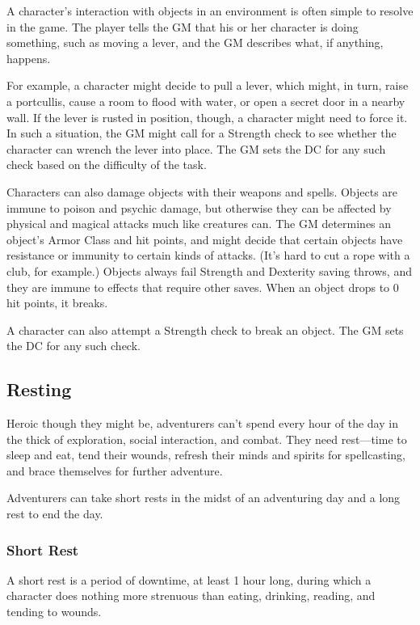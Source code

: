 \documentclass[
]{article}
\begin{document}
A character's interaction with objects in an environment is often simple
to resolve in the game. The player tells the GM that his or her
character is doing something, such as moving a lever, and the GM
describes what, if anything, happens.

For example, a character might decide to pull a lever, which might, in
turn, raise a portcullis, cause a room to flood with water, or open a
secret door in a nearby wall. If the lever is rusted in position,
though, a character might need to force it. In such a situation, the GM
might call for a Strength check to see whether the character can wrench
the lever into place. The GM sets the DC for any such check based on the
difficulty of the task.

Characters can also damage objects with their weapons and spells.
Objects are immune to poison and psychic damage, but otherwise they can
be affected by physical and magical attacks much like creatures can. The
GM determines an object's Armor Class and hit points, and might decide
that certain objects have resistance or immunity to certain kinds of
attacks. (It's hard to cut a rope with a club, for example.) Objects
always fail Strength and Dexterity saving throws, and they are immune to
effects that require other saves. When an object drops to 0 hit points,
it breaks.

A character can also attempt a Strength check to break an object. The GM
sets the DC for any such check.

\hypertarget{resting}{%
\subsection{Resting}\label{resting}}

Heroic though they might be, adventurers can't spend every hour of the
day in the thick of exploration, social interaction, and combat. They
need rest---time to sleep and eat, tend their wounds, refresh their
minds and spirits for spellcasting, and brace themselves for further
adventure.

Adventurers can take short rests in the midst of an adventuring day and
a long rest to end the day.

\hypertarget{short-rest}{%
\subsubsection{Short Rest}\label{short-rest}}

A short rest is a period of downtime, at least 1 hour long, during which
a character does nothing more strenuous than eating, drinking, reading,
and tending to wounds.
\end{document}
